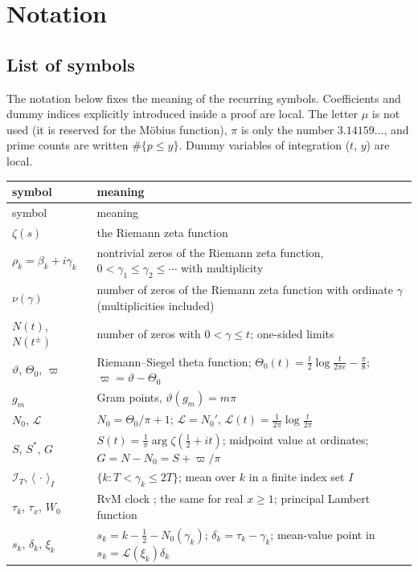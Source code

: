 \documentclass[preprint,12pt]{elsarticle}
\makeatletter
\let\CG@origeqref\eqref
\newcommand{\CG@gettip}[1]{\@ifundefined{CGTip@#1}{Reference: #1}{\csname CGTip@#1\endcsname}}
\DeclareRobustCommand{\CGeqref}[1]{\pdftooltip{\CG@origeqref{#1}}{\CG@gettip{#1}}}
\numberwithin{equation}{section}
\theoremstyle{plain}
\theoremstyle{definition}
\theoremstyle{remark}
\newcommand{\NO}{N_0}
\newcommand{\lL}{\mathcal L}
\newcommand{\IT}{\mathcal I_T}
\makeatother
\begin{document}
\section{Notation}
\label{sec:notation}

\subsection{List of symbols}
\label{subsec:symbols}
The notation below fixes the meaning of the recurring symbols. Coefficients and dummy indices explicitly introduced inside a proof are local. The letter $\mu$ is not used (it is reserved for the M\"obius function), $\pi$ is only the number $3.14159\ldots$, and prime counts are written $\#\{p\le y\}$. Dummy variables of integration ($t$, $y$) are local.

\begin{center}
\small
\begin{longtable}{p{}p{}}
\toprule
symbol & meaning\\
\midrule
\endfirsthead
\toprule
symbol & meaning\\
\midrule
\endhead
\bottomrule
\endfoot
$\zeta(s)$ & the Riemann zeta function\\
$\rho_k=\beta_k+i\gamma_k$ & nontrivial zeros of the Riemann zeta function, $0<\gamma_1\le\gamma_2\le\cdots$ with multiplicity\\
$\nu(\gamma)$ & number of zeros of the Riemann zeta function with ordinate $\gamma$ (multiplicities included)\\
$N(t)$, $N(t^\pm)$ & number of zeros with $0<\gamma\le t$; one-sided limits\\
$\vartheta$, $\Theta_0$, $\varpi$ & Riemann--Siegel theta function; $\Theta_0(t)=\frac t2\log\frac t{2\pi e}-\frac\pi8$; $\varpi=\vartheta-\Theta_0$\\
$g_m$ & Gram points, $\vartheta(g_m)=m\pi$\\
$\NO$, $\lL$ & $\NO=\Theta_0/\pi+1$; $\lL=\NO'$, $\lL(t)=\frac1{2\pi}\log\frac t{2\pi}$\\
$S$, $S^*$, $G$ & $S(t)=\frac1\pi\arg\zeta(\frac12+it)$; midpoint value at ordinates; $G=N-\NO=S+\varpi/\pi$\\
$\IT$, $\langle\,\cdot\,\rangle_I$ & $\{k:T<\gamma_k\le2T\}$; mean over $k$ in a finite index set $I$\\
$\tau_k$, $\tau_x$, $W_0$ & RvM clock \CGeqref{eq:clock}; the same for real $x\ge1$; principal Lambert function\\
$s_k$, $\delta_k$, $\xi_k$ & $s_k=k-\frac12-\NO(\gamma_k)$; $\delta_k=\tau_k-\gamma_k$; mean-value point in $s_k=\lL(\xi_k)\delta_k$\\

\end{longtable}
\end{center}
\end{document}
